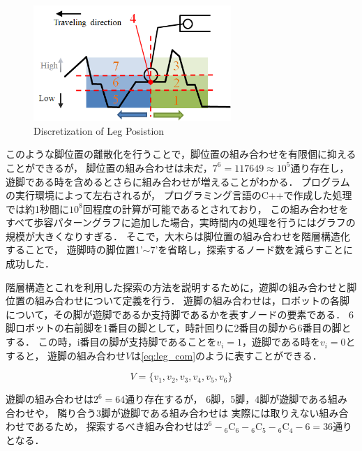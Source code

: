 \begin{figure}[h]
  \begin{center}
    \includegraphics[width=75mm, clip]{figure/chapter2/discretization_of_leg_pos.png}
    \caption{Discretization of Leg Posistion}
    \label{fig:discretization} %
  \end{center}
\end{figure}

このような脚位置の離散化を行うことで，脚位置の組み合わせを有限個に抑えることができるが，
脚位置の組み合わせは未だ，$7^6 = 117649 \approx 10^5$通り存在し，
遊脚である時を含めるとさらに組み合わせが増えることがわかる．
プログラムの実行環境によって左右されるが，
プログラミング言語のC++で作成した処理では約1秒間に$10^8$回程度の計算が可能であるとされており\cite{Program_Challenge_Book}，
この組み合わせをすべて歩容パターングラフに追加した場合，実時間内の処理を行うにはグラフの規模が大きくなりすぎる．
そこで，大木らは脚位置の組み合わせを階層構造化することで，
遊脚時の脚位置1'$\sim$7'を省略し，探索するノード数を減らすことに成功した\cite{Oki_Graph_search}．

階層構造とこれを利用した探索の方法を説明するために，遊脚の組み合わせと脚位置の組み合わせについて定義を行う．
遊脚の組み合わせは，ロボットの各脚について，その脚が遊脚であるか支持脚であるかを表すノードの要素である．
6脚ロボットの右前脚を1番目の脚として，時計回りに2番目の脚から6番目の脚とする．
この時，i番目の脚が支持脚であることを$v_i = 1$，遊脚である時を$v_i = 0$とすると，
遊脚の組み合わせ$V$は\eqref{eq:leg_com}のように表すことができる．

\begin{equation}\label{eq:leg_com}
  V = \{v_1, v_2, v_3, v_4, v_5, v_6\}
\end{equation}

\noindent 遊脚の組み合わせは$2^6 = 64$通り存在するが，
6脚，5脚，4脚が遊脚である組み合わせや，
隣り合う3脚が遊脚である組み合わせは
実際には取りえない組み合わせであるため，
探索するべき組み合わせは$2^6 - {}_6 \mathrm{C}_6 - {}_6 \mathrm{C}_5 - {}_6 \mathrm{C}_4 - 6 = 36$通りとなる．


